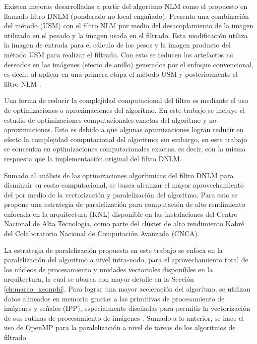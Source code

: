 Existen mejoras desarrolladas a partir del algoritmo NLM como el propuesto en \cite{calderon2015dewaff} llamado filtro DNLM  (ponderado no local enga\~nado). Presenta una combinación del método  (USM) con el filtro NLM por medio del desacoplamiento de la imagen utilizada en el pesado y la imagen usada en el filtrado. Esta modificación utiliza la imagen de entrada para el cálculo de los pesos y la imagen producto del método USM para realizar el filtrado. Con esto se reducen los artefactos no deseados en las imágenes (efecto de anillo) generados por el enfoque convencional, es decir, al aplicar en una primera etapa el método USM y posteriormente el filtro NLM \cite{calderon2015dewaff}.  


Una forma de reducir la complejidad computacional del filtro es mediante el uso de optimizaciones o aproximaciones del algoritmo. En este trabajo se incluye el estudio de optimizaciones computacionales exactas del algoritmo y no aproximaciones. Esto es debido a que algunas optimizaciones logran reducir en efecto la complejidad computacional del algoritmo; sin embargo, en este trabajo se concentra en optimizaciones computacionales exactas, es decir, con la misma respuesta que la implementación original del filtro DNLM. 

Sumado al análisis de las optimizaciones algorítmicas del filtro DNLM para disminuir su costo computacional, se busca alcanzar el mayor aprovechamiento del  por medio de la vectorización y paralelización del algoritmo. Para esto se propone una estrategia de paralelización para computación de alto rendimiento enfocada en la arquitectura  (KNL) disponible en las instalaciones del Centro Nacional de Alta Tecnología, como parte del clúster de alto rendimiento Kabré del Colaboratorio Nacional de Computación Avanzada (CNCA).

La estrategia de paralelización propuesta en este trabajo se enfoca en la paralelización del algoritmo a nivel intra-nodo, para el aprovechamiento total de los núcleos de procesamiento y unidades vectoriales disponibles en la arquitectura, la cual se abarca con mayor detalle en la Sección \ref{ch:marco_xeonphi}. 
Para lograr una mayor aceleración del algoritmo, se utilizan datos alineados en memoria gracias a las primitivas de procesamiento de imágenes y se\~nales  (IPP), especialmente dise\~nadas para permitir la vectorización de sus rutinas de procesamiento de imágenes \cite{IntelCorporation2017}. Sumado a lo anterior, se hace el uso de OpenMP para la paralelización a nivel de tareas de los algoritmos de filtrado. 

